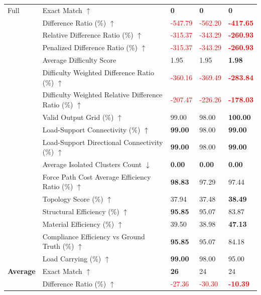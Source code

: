 \begin{table}[!h]
{\begin{tabular}{lllll}
Full & Exact Match $\uparrow$ & \textbf{0} & \textbf{0} & \textbf{0} \\
 & Difference Ratio (\%) $\uparrow$ & \textcolor{red}{-547.79} & \textcolor{red}{-562.20} & \textbf{\textcolor{red}{-417.65}} \\
 & Relative Difference Ratio (\%) $\uparrow$ & \textcolor{red}{-315.37} & \textcolor{red}{-343.29} & \textbf{\textcolor{red}{-260.93}} \\
 & Penalized Difference Ratio (\%) $\uparrow$ & \textcolor{red}{-315.37} & \textcolor{red}{-343.29} & \textbf{\textcolor{red}{-260.93}} \\
 & Average Difficulty Score & 1.95 & 1.95 & \textbf{1.98} \\
 & Difficulty Weighted Difference Ratio (\%) $\uparrow$ & \textcolor{red}{-360.16} & \textcolor{red}{-369.49} & \textbf{\textcolor{red}{-283.84}} \\
 & Difficulty Weighted Relative Difference Ratio (\%) $\uparrow$ & \textcolor{red}{-207.47} & \textcolor{red}{-226.26} & \textbf{\textcolor{red}{-178.03}} \\
 & Valid Output Grid (\%) $\uparrow$ & 99.00 & 98.00 & \textbf{100.00} \\
 & Load-Support Connectivity (\%) $\uparrow$ & \textbf{99.00} & 98.00 & \textbf{99.00} \\
 & Load-Support Directional Connectivity (\%) $\uparrow$ & \textbf{99.00} & 98.00 & \textbf{99.00} \\
 & Average Isolated Clusters Count $\downarrow$ & \textbf{0.00} & \textbf{0.00} & \textbf{0.00} \\
 & Force Path Cost Average Efficiency Ratio (\%) $\uparrow$ & \textbf{98.83} & 97.29 & 97.44 \\
 & Topology Score (\%) $\uparrow$ & 37.94 & 37.48 & \textbf{38.49} \\
 & Structural Efficiency (\%) $\uparrow$ & \textbf{95.85} & 95.07 & 83.87 \\
 & Material Efficiency (\%) $\uparrow$ & 39.50 & 38.98 & \textbf{47.13} \\
 & Compliance Efficiency vs Ground Truth (\%) $\uparrow$ & \textbf{95.85} & 95.07 & 84.18 \\
 & Load Carrying (\%) $\uparrow$ & \textbf{99.00} & 98.00 & 95.00 \\
\midrule
\textbf{Average} & Exact Match $\uparrow$ & \textbf{26} & 24 & 24 \\
 & Difference Ratio (\%) $\uparrow$ & \textcolor{red}{-27.36} & \textcolor{red}{-30.30} & \textbf{\textcolor{red}{-10.39}} \\

\end{tabular}}
\end{table}
